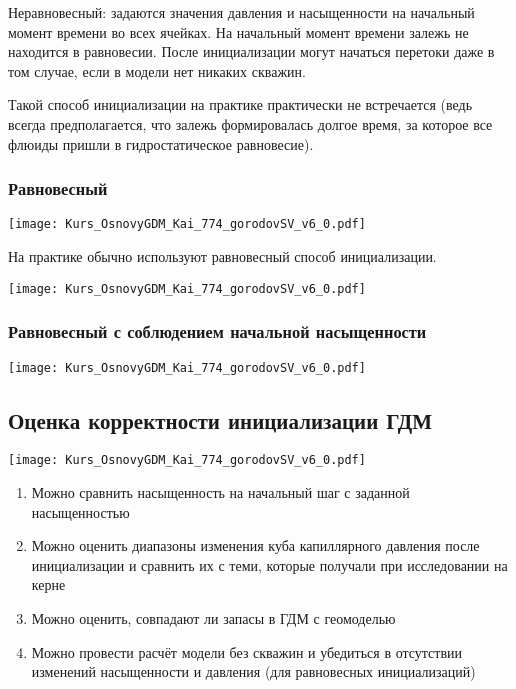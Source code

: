 \documentclass[main.tex]{subfiles}
\begin{document}
Неравновесный: задаются значения давления и насыщенности на начальный момент времени во всех ячейках.
На начальный момент времени залежь не находится в равновесии. После инициализации могут начаться перетоки даже в том случае, если в модели нет никаких скважин.

Такой способ инициализации на практике практически не встречается (ведь всегда предполагается, что залежь формировалась долгое время, за которое все флюиды пришли в гидростатическое равновесие).

\subsubsection{Равновесный}

\texttt{[image: Kurs\_OsnovyGDM\_Kai\_774\_gorodovSV\_v6\_0.pdf]}

На практике обычно используют равновесный способ инициализации.

\texttt{[image: Kurs\_OsnovyGDM\_Kai\_774\_gorodovSV\_v6\_0.pdf]}

\subsubsection{Равновесный с соблюдением начальной насыщенности}

\texttt{[image: Kurs\_OsnovyGDM\_Kai\_774\_gorodovSV\_v6\_0.pdf]}

\subsection{Оценка корректности инициализации ГДМ}

\texttt{[image: Kurs\_OsnovyGDM\_Kai\_774\_gorodovSV\_v6\_0.pdf]}

\begin{enumerate}
	\item Можно сравнить насыщенность на начальный шаг с заданной насыщенностью
	\item Можно оценить диапазоны изменения куба капиллярного давления после инициализации и сравнить их с теми, которые получали при исследовании на керне
	\item Можно оценить, совпадают ли запасы в ГДМ с геомоделью
	\item Можно провести расчёт модели без скважин и убедиться в отсутствии изменений насыщенности и давления (для равновесных инициализаций)
\end{enumerate}
\end{document}
